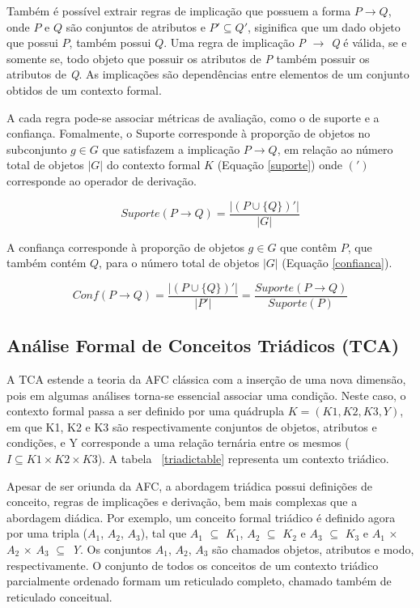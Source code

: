 \documentclass[kdmile,a4paper]{kdmile} %
\begin{document}
Também é possível extrair regras de implicação que possuem a forma $P \rightarrow Q$, onde $P$ e $Q$ são conjuntos de atributos e $P' \subseteq Q'$, siginifica que um dado objeto que possui $P$, também possui $Q$. Uma regra de implicação \textit{P} $\rightarrow$ \textit{Q} é  válida, se e somente se, todo objeto que possuir os atributos de \textit{P} também possuir os atributos de \textit{Q}. As implicações são dependências entre elementos de um conjunto obtidos de um contexto formal.


A cada regra pode-se associar métricas de avaliação, como o de suporte e a confiança. Fomalmente, o Suporte corresponde à proporção de objetos no subconjunto $ g \in G$ que satisfazem a implicação \textit {$ P \rightarrow Q $}, em relação ao número total de objetos $ | G | $ do contexto formal $ K $ (Equação \ref {suporte}) onde $ (' )$ corresponde ao operador de derivação.



\begin{equation}
\label{suporte}
 Suporte(P \to Q) = \frac{|(P \cup \{Q\})'|}{|G|}
\end{equation}

A confiança corresponde à proporção de objetos $ g \in G $ que contêm $ P $, que também contém $ Q $, para o número total de objetos $ | G | $ (Equação \ref {confianca}).

\begin{equation}
 Conf(P \to Q) = \frac{|(P \cup \{Q\})'|}{|P'|} =  \frac{Suporte(P \to Q)}{Suporte(P)} \label{confianca}
\end{equation}

\subsection{Análise Formal de Conceitos Triádicos (TCA)}
A TCA estende a teoria da AFC clássica com a inserção de uma nova dimensão, pois em algumas análises torna-se essencial associar uma condição. Neste caso, o contexto formal passa a ser definido por uma quádrupla $K = (K1, K2, K3, Y)$, em que K1, K2 e K3 são respectivamente conjuntos de objetos, atributos e condições, e Y corresponde a uma relação ternária entre os mesmos ($I \subseteq K1 \times K2 \times K3 $). A tabela ~\ref{triadictable} representa um contexto triádico.

Apesar de ser oriunda da AFC, a abordagem triádica possui definições de conceito, regras de implicações e derivação, bem mais complexas que a abordagem diádica. Por exemplo, um conceito formal triádico é definido agora por uma tripla ($A_{1}$, $A_{2}$, $A_{3}$), tal que $A_{1}$ $\subseteq$ $K_{1}$, $A_{2}$ $\subseteq$ $K_{2}$ e $A_{3}$ $\subseteq$ $K_{3}$ e $A_{1}$ $\times$ $A_{2}$ $\times$ $A_{3}$ $\subseteq$ \textit{Y}. Os conjuntos $A_{1}$, $A_{2}$, $A_{3}$ são chamados objetos, atributos e modo, respectivamente. O conjunto de todos os conceitos de um contexto triádico parcialmente ordenado formam um reticulado completo, chamado também de reticulado conceitual.
\end{document}
